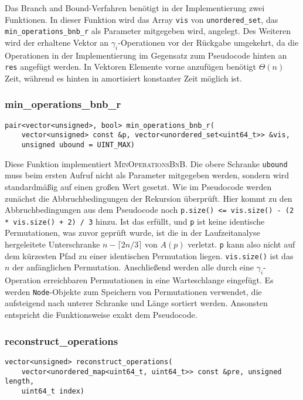 \documentclass[a4paper, 10pt, ngerman]{article}
\begin{document}
\noindent Das Branch and Bound-Verfahren benötigt in der Implementierung zwei Funktionen. In dieser Funktion wird das Array \verb|vis| von \verb|unordered_set|, das \verb|min_operations_bnb_r| als Parameter mitgegeben wird, angelegt. Des Weiteren wird der erhaltene Vektor an $\gamma_i$-Operationen vor der Rückgabe umgekehrt, da die Operationen in der Implementierung im Gegensatz zum Pseudocode hinten an \verb|res| angefügt werden. In Vektoren Elemente vorne anzufügen benötigt $\Theta(n)$ Zeit, während es hinten in amortisiert konstanter Zeit möglich ist.

\subsubsection{min\_operations\_bnb\_r}
\verb|pair<vector<unsigned>, bool> min_operations_bnb_r(| \\
\verb|    vector<unsigned> const &p, vector<unordered_set<uint64_t>> &vis,| \\
\verb|    unsigned ubound = UINT_MAX)|
\medskip

\noindent Diese Funktion implementiert \textsc{MinOperationsBnB}. Die obere Schranke \verb|ubound| muss beim ersten Aufruf nicht als Parameter mitgegeben werden, sondern wird standardmäßig auf einen großen Wert gesetzt. Wie im Pseudocode werden zunächst die Abbruchbedingungen der Rekursion überprüft. Hier kommt zu den Abbruchbedingungen aus dem Pseudocode noch \verb|p.size() <= vis.size() - (2 * vis.size() + 2) / 3| hinzu. Ist das erfüllt, und \verb|p| ist keine identische Permutationen, was zuvor geprüft wurde, ist die in der Laufzeitanalyse hergeleitete Unterschranke $n - \lceil 2n / 3 \rceil$ von $A(p)$ verletzt. \verb|p| kann also nicht auf dem kürzesten Pfad zu einer identischen Permutation liegen. \verb|vis.size()| ist das $n$ der anfänglichen Permutation. Anschließend werden alle durch eine $\gamma_i$-Operation erreichbaren Permutationen in eine Warteschlange eingefügt. Es werden \verb|Node|-Objekte zum Speichern von Permutationen verwendet, die aufsteigend nach unterer Schranke und Länge sortiert werden. Ansonsten entspricht die Funktionsweise exakt dem Pseudocode.

\subsubsection{reconstruct\_operations}
\verb|vector<unsigned> reconstruct_operations(| \\
\verb|    vector<unordered_map<uint64_t, uint64_t>> const &pre, unsigned length,| \\
\verb|    uint64_t index)|
\medskip
\end{document}

